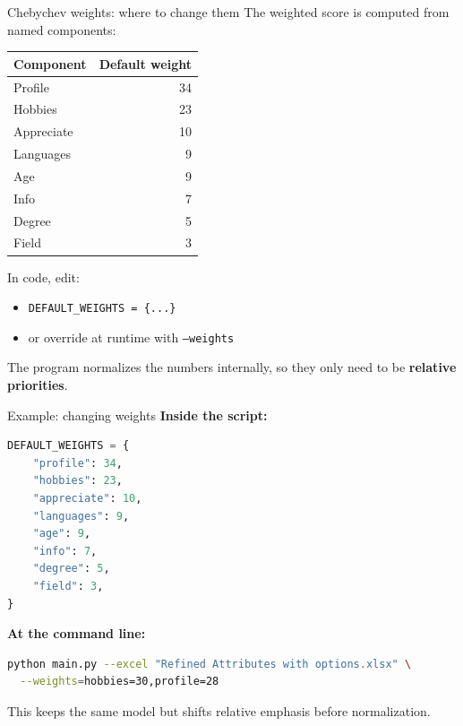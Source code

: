 \documentclass[aspectratio=169]{beamer}
\begin{document}
\begin{frame}{Chebychev weights: where to change them}
The weighted score is computed from named components:
\begin{center}
\begin{tabular}{lr}
\toprule
Component & Default weight \\
\midrule
Profile & 34 \\
Hobbies & 23 \\
Appreciate & 10 \\
Languages & 9 \\
Age & 9 \\
Info & 7 \\
Degree & 5 \\
Field & 3 \\
\bottomrule
\end{tabular}
\end{center}

In code, edit:
\begin{itemize}
  \item \texttt{DEFAULT\_WEIGHTS = \{...\}}
  \item or override at runtime with \texttt{--weights}
\end{itemize}
The program normalizes the numbers internally, so they only need to be \textbf{relative priorities}.
\end{frame}

\begin{frame}[fragile]{Example: changing weights}
\textbf{Inside the script:}
\begin{lstlisting}[language=Python]
DEFAULT_WEIGHTS = {
    "profile": 34,
    "hobbies": 23,
    "appreciate": 10,
    "languages": 9,
    "age": 9,
    "info": 7,
    "degree": 5,
    "field": 3,
}
\end{lstlisting}

\textbf{At the command line:}
\begin{lstlisting}[language=bash]
python main.py --excel "Refined Attributes with options.xlsx" \
  --weights=hobbies=30,profile=28
\end{lstlisting}

This keeps the same model but shifts relative emphasis before normalization.
\end{frame}
\end{document}
